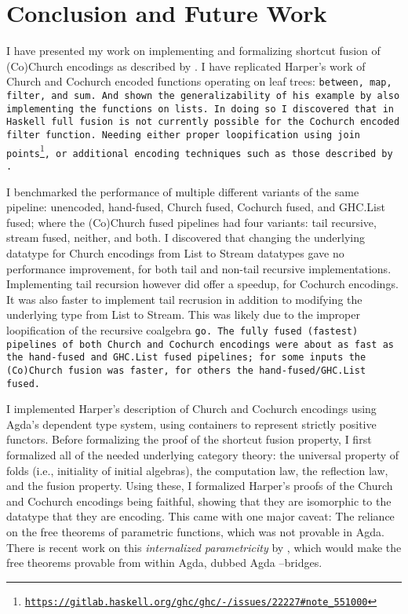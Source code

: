 \section{Conclusion and Future Work}\label{sec:conclusion}
I have presented my work on implementing and formalizing shortcut fusion of (Co)Church encodings as described by \cite{Harper2011}.
I have replicated Harper's work of Church and Cochurch encoded functions operating on leaf trees: \tt{between}, \tt{map}, \tt{filter}, and \tt{sum}.
And shown the generalizability of his example by also implementing the functions on lists.
In doing so I discovered that in Haskell full fusion is not currently possible for the Cochurch encoded filter function.
Needing either proper loopification using join points\footnote{\url{https://gitlab.haskell.org/ghc/ghc/-/issues/22227\#note_551000}}, or additional encoding techniques such as those described by \cite{Coutts2007}.

I benchmarked the performance of multiple different variants of the same pipeline: unencoded, hand-fused, Church fused, Cochurch fused, and GHC.List fused; where the (Co)Church fused pipelines had four variants: tail recursive, stream fused, neither, and both.
I discovered that changing the underlying datatype for Church encodings from List to Stream datatypes gave no performance improvement, for both tail and non-tail recursive implementations. Implementing tail recursion however did offer a speedup, for Cochurch encodings.
It was also faster to implement tail recrusion in addition to modifying the underlying type from List to Stream.
This was likely due to the improper loopification of the recursive coalgebra \tt{go}.
The fully fused (fastest) pipelines of both Church and Cochurch encodings were about as fast as the hand-fused and GHC.List fused pipelines; for some inputs the (Co)Church fusion was faster, for others the hand-fused/GHC.List fused.

I implemented Harper's description of Church and Cochurch encodings using Agda's dependent type system, using containers to represent strictly positive functors.
Before formalizing the proof of the shortcut fusion property, I first formalized all of the needed underlying category theory: the universal property of folds (i.e., initiality of initial algebras), the computation law, the reflection law, and the fusion property.
Using these, I formalized Harper's proofs of the Church and Cochurch encodings being faithful, showing that they are isomorphic to the datatype that they are encoding.
This came with one major caveat: The reliance on the free theorems of parametric functions, which was not provable in Agda.
There is recent work on this \textit{internalized parametricity} by \cite{Muylder2024}, which would make the free theorems provable from within Agda, dubbed Agda --bridges.

